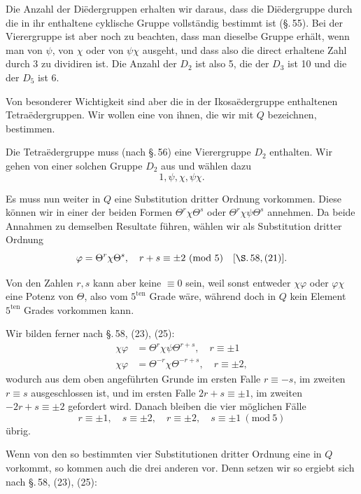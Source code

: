 Die Anzahl der Di\"edergruppen erhalten wir daraus, dass die Di\"edergruppe durch die in ihr enthaltene cyklische Gruppe vollständig bestimmt ist (\S.\,55). Bei der Vierergruppe ist aber noch zu beachten, dass man dieselbe Gruppe erhält, wenn man von $\psi$, von $\chi$ oder von $\psi\chi$ ausgeht, und dass also die direct erhaltene Zahl durch 3 zu dividiren ist. Die Anzahl der $D_2$ ist also 5, die der $D_3$ ist 10 und die der $D_5$ ist 6.

Von besonderer Wichtigkeit sind aber die in der Ikosa\"edergruppe enthaltenen Tetra\"edergruppen. Wir wollen eine von ihnen, die wir mit $Q$ bezeichnen, bestimmen.

Die Tetra\"edergruppe muss (nach \S.\,56) eine Vierergruppe $D_2$ enthalten. Wir gehen von einer solchen Gruppe $D_2$ aus und wählen dazu
\[
1, \psi, \chi, \psi\chi.
\]

Es muss nun weiter in $Q$ eine Substitution dritter Ordnung vorkommen. Diese können wir in einer der beiden Formen $\Theta^r\chi\Theta^s$ oder $\Theta^r\chi\psi\Theta^s$ annehmen. Da beide Annahmen zu demselben Resultate führen, wählen wir als Substitution dritter Ordnung
\[
\varphi = \Theta^r\chi\Theta^s, \quad r+s\equiv\pm2 \ (\mathrm{mod}\ 5) \quad [\S.\,58, (21)].
\]

Von den Zahlen $r, s$ kann aber keine $\equiv0$ sein, weil sonst entweder $\chi\varphi$ oder $\varphi\chi$ eine Potenz von $\Theta$, also vom $5^{\mathrm{ten}}$ Grade wäre, während doch in $Q$ kein Element $5^{\mathrm{ten}}$ Grades vorkommen kann.

Wir bilden ferner nach \S.\,58, (23), (25):
\[
\begin{aligned}
\chi\varphi &= \Theta^r\chi\psi\Theta^{r+s}, \quad r\equiv\pm1 \\
\chi\varphi &= \Theta^{-r}\chi\Theta^{-r+s}, \quad r\equiv\pm2,
\end{aligned}
\]
wodurch aus dem oben angeführten Grunde im ersten Falle $r\equiv-s$, im zweiten $r\equiv s$ ausgeschlossen ist, und im ersten Falle $2r+s\equiv\pm1$, im zweiten $-2r+s\equiv\pm2$ gefordert wird. Danach bleiben die vier möglichen Fälle
\[
r\equiv\pm1, \quad s\equiv\pm2, \quad r\equiv\pm2, \quad s\equiv\pm1 \ (\mathrm{mod}\ 5)
\]
übrig.

Wenn von den so bestimmten vier Substitutionen dritter Ordnung eine in $Q$ vorkommt, so kommen auch die drei anderen vor. Denn setzen wir
so ergiebt sich nach \S.\,58, (23), (25):

